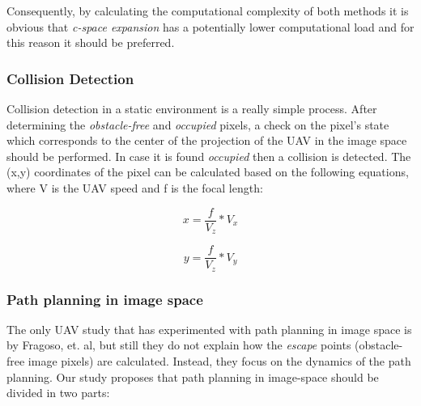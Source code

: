 
Consequently, by calculating the computational complexity of both methods it is obvious that \textit{c-space expansion} has a potentially lower computational load and for this reason it should be preferred. 

\subsubsection{Collision Detection}

Collision detection in a static environment is a really simple process. After determining the \textit{obstacle-free} and \textit{occupied} pixels, a check on the pixel's state which corresponds to the center of the projection of the \ac{UAV} in the image space should be performed. In case it is found \textit{occupied} then a collision is detected. The (x,y) coordinates of the pixel can be calculated based on the following equations, where V is the \ac{UAV} speed and f is the focal length:

\begin{equation}\label{eq:x_col_check}
x = \frac{f}{V_z} * V_x
\end{equation}

\begin{equation}\label{eq:y_col_check}
y = \frac{f}{V_z} * V_y
\end{equation}


\subsubsection{Path planning in image space}
\label{ch:literature:state_of_the_art_avoidance:reactive_image_navigation:path_planning}


The only \ac{UAV} study that has experimented with path planning in image space is by Fragoso, et. al, \cite{Fragoso2017} but still they do not explain how the \textit{escape} points (obstacle-free image pixels) are calculated. Instead, they focus on the dynamics of the path planning. Our study proposes that path planning in image-space should be divided in two parts: 


